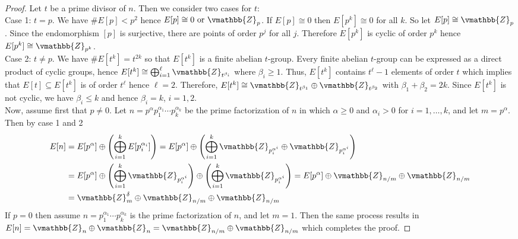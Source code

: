\begin{proof}
Let $t$ be a prime divisor of $n$. Then we consider two cases for $t$: \\
Case 1: $t = p$. We have $\#E[p] < p^2$ hence $E[p] \cong 0 \text{ or } \vmathbb{Z}_p$. If $E[p] 
\cong 0$ then $E[p^k] \cong 0$ for all $k$. So let $E[p] \cong \vmathbb{Z}_p$. Since the endomorphism 
$[p]$ is surjective, there are points of order $p^j$ for all $j$. Therefore $E[p^k]$ is cyclic of 
order $p^k$ hence $E[p^k] \cong \vmathbb{Z}_{p^k}$. \\
Case 2: $t \ne p$. We have $\#E[t^k] = t^{2k}$ so that $E[t^k]$ is a finite abelian $t$-group. Every 
finite abelian $t$-group can be expressed as a direct product of cyclic groups, hence $E[t^k] \cong 
\bigoplus_{i = 1}^\ell \vmathbb{Z}_{t^{\beta_i}}$ where $\beta_i \ge 1$. Thus, $E[t^k]$ contains 
$t^\ell - 1$ elements of order $t$ which implies that $E[t] \subseteq E[t^k]$ is of order $t^\ell$ 
hence $\ell = 2$. Therefore, $E[t^k] \cong \vmathbb{Z}_{t^{\beta_1}} \oplus \vmathbb{Z}_{t^{\beta_2}}$ 
with $\beta_1 + \beta_2 = 2k$. Since $E[t^k]$ is not cyclic, we have $\beta_i \le k$ and hence 
$\beta_i = k$, $i = 1, 2$. \\
Now, assume first that $p \ne 0$. Let $n = p^\alpha p_1^{\alpha_1} \cdots p_k^{\alpha_k}$ be the 
prime factorization of $n$ in which $\alpha \ge 0$ and $\alpha_i > 0$ for $i = 1, \dots, k$, and let 
$m = p^\alpha$. Then by case 1 and 2
\begin{align*}
E[n] 
&= E[p^\alpha] \oplus \left( \bigoplus_{i = 1}^k E[p_i^{\alpha_i}] \right) = E[p^\alpha] \oplus 
\left( \bigoplus_{i = 1}^k \vmathbb{Z}_{p_i^{\alpha^i}} \oplus \vmathbb{Z}_{p_i^{\alpha^i}} \right) \\
&= E[p^\alpha] \oplus \left( \bigoplus_{i = 1}^k  \vmathbb{Z}_{p_i^{\alpha^i}} \right) \oplus \left( 
\bigoplus_{i = 1}^k  \vmathbb{Z}_{p_i^{\alpha^i}} \right) = E[p^\alpha] \oplus \vmathbb{Z}_{n / m} 
\oplus \vmathbb{Z}_{n / m} \\
&= \vmathbb{Z}_m^{\delta} \oplus \vmathbb{Z}_{n / m} \oplus \vmathbb{Z}_{n / m}
\end{align*}
If $p = 0$ then assume $n = p_1^{\alpha_1} \cdots p_k^{\alpha_k}$ is the prime factorization of $n$, 
and let $m = 1$. Then the same process results in $E[n] = \vmathbb{Z}_{n} \oplus \vmathbb{Z}_{n} = 
\vmathbb{Z}_{n / m} \oplus \vmathbb{Z}_{n / m}$ which completes the proof.
\end{proof}